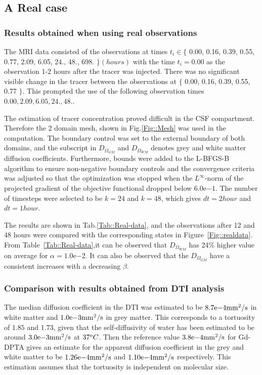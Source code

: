 \documentclass[11pt,a4paper]{article}
\begin{document}
\subsection{A Real case} 

\subsubsection{Results obtained when using real observations}
The MRI data consisted of the observations at times $t_i \in \lbrace$ 0.00, 0.16, 0.39, 0.55, 0.77, 2.09, 6.05, 24., 48., 698. $\rbrace (hours)$ with the time $t_i=0.00$ as the observation 1-2 hours after the tracer was injected. There was no significant visible change in the tracer between the observations at $\lbrace $ 0.00, 0.16, 0.39, 0.55, 0.77 $ \rbrace$. This prompted the use of the following observation times  $0.00, 2.09, 6.05, 24., 48.$. 

The estimation of tracer concentration proved difficult in the CSF compartment. Therefore the 2 domain mesh, shown in Fig.\ref{Fig::Mesh} was used in the computation. The boundary control was set to the external boundary of both domains, and the subscript in $D_{\Omega_{GM}}$ and $D_{\Omega_{WM}}$ denotes grey and white matter diffusion coefficients. Furthermore, bounds were added to the L-BFGS-B algorithm to ensure non-negative boundary controls and the convergence criteria was adjusted so that the optimization was stopped when the $L^\infty$-norm of the projected gradient of the objective functional dropped below $6.0\mathrm{e}{-1}$. The number of timesteps were selected to be $k=24$ and $k=48$, which gives $dt = 2 hour$ and $dt = 1 hour$.   

The results are shown in Tab.\ref{Tab::Real-data}, and the observations after 12 and 48 hours were compared with the corresponding states in Figure~\ref{Fig::realdata}. From Table~\ref{Tab::Real-data},it can be observed that $D_{\Omega_{WM}}$ has 24\% higher value on average for $\alpha =1.0\mathrm{e}{-2}$. It can also be observed that the $D_{\Omega_{GM}}$ have a consistent increases with a decreasing $\beta$. 

\subsubsection{Comparison with results obtained from DTI analysis}
 
The median diffusion coefficient in the DTI was estimated to be $8.7\mathrm{e}{-4} \mathrm{mm\sp{2}/s}$ in white matter and $1.0\mathrm{e}{-3} \mathrm{mm\sp{2}/s}$ in grey matter. This corresponds to a tortuosity of $1.85$ and $1.73$, given that the self-diffusivity of water has been estimated to be around $3.0\mathrm{e}{-3}\mathrm{mm\sp{2}/s}$ at $37\sp{o}C$. Then the reference value $3.8\mathrm{e}{-4} \mathrm{mm\sp{2}/s}$ for Gd-DPTA gives an estimate for the apparent diffusion coefficient in the grey and white matter to  be $ 1.26\mathrm{e}{-4}\mathrm{mm\sp{2}/s}$ and $1.10\mathrm{e}{-4} \mathrm{mm\sp{2}/s}$ respectively. This estimation assumes that the tortuosity is independent on molecular size. 
\end{document}
